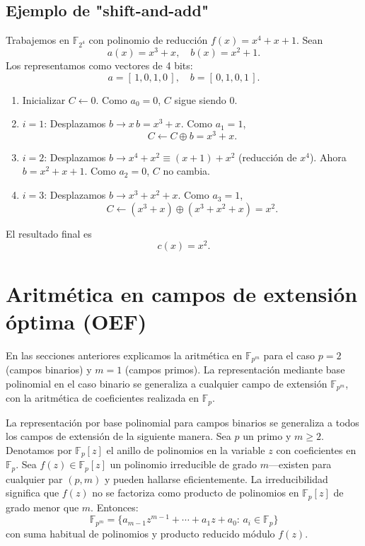 \subsection*{Ejemplo de "shift-and-add"}

Trabajemos en \(\mathbb{F}_{2^4}\) con polinomio de reducción \(f(x)=x^4 + x + 1\).  
Sean
\[
  a(x) = x^3 + x,\quad b(x) = x^2 + 1.
\]
Los representamos como vectores de 4 bits: 
\[
  a = [\,1,0,1,0\,],\quad b = [\,0,1,0,1\,].
\]
\begin{enumerate}
  \item Inicializar \(C\gets0\). Como \(a_0=0\), \(C\) sigue siendo 0.
  \item \(i=1\): Desplazamos \(b\to x\,b = x^3 + x\). Como \(a_1=1\), 
    \[
      C \gets C \oplus b = x^3 + x.
    \]
  \item \(i=2\): Desplazamos \(b\to x^4 + x^2 \equiv (x+1) + x^2\) (reducción de \(x^4\)). 
    Ahora \(b = x^2 + x + 1\). Como \(a_2=0\), \(C\) no cambia.
  \item \(i=3\): Desplazamos \(b\to x^3 + x^2 + x\). Como \(a_3=1\), 
    \[
      C \gets (x^3 + x)\oplus(x^3 + x^2 + x) = x^2.
    \]
\end{enumerate}
El resultado final es 
\[
  c(x) = x^2.
\]

\section{Aritmética en campos de extensión óptima (OEF)}
En las secciones anteriores explicamos la aritmética en \(\mathbb{F}_{p^m}\) para el caso \(p=2\) (campos binarios) y \(m=1\) (campos primos). La representación mediante base polinomial en el caso binario se generaliza a cualquier campo de extensión \(\mathbb{F}_{p^m}\), con la aritmética de coeficientes realizada en \(\mathbb{F}_p\).

La representación por base polinomial para campos binarios se generaliza a todos los campos de extensión de la siguiente manera. Sea $p$ un primo y $m\ge2$. Denotamos por $\mathbb{F}_p[z]$ el anillo de polinomios en la variable $z$ con coeficientes en $\mathbb{F}_p$. Sea $f(z)\in\mathbb{F}_p[z]$ un polinomio irreducible de grado $m$—existen para cualquier par $(p,m)$ y pueden hallarse eficientemente. La irreducibilidad significa que $f(z)$ no se factoriza como producto de polinomios en $\mathbb{F}_p[z]$ de grado menor que $m$. Entonces:
\[
  \mathbb{F}_{p^m}=\{a_{m-1}z^{m-1}+\cdots+a_1z+a_0:\,a_i\in\mathbb{F}_p\}
\]
con suma habitual de polinomios y producto reducido módulo $f(z)$.

